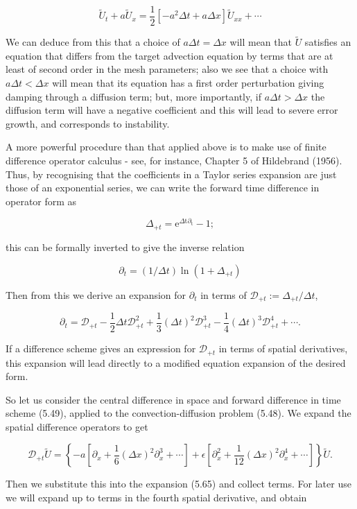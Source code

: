 \documentclass[10pt]{article}
\begin{document}
\[
\tilde{U}_{t}+a \tilde{U}_{x}=\frac{1}{2}\left[-a^{2} \Delta t+a \Delta x\right] \tilde{U}_{x x}+\cdots
\]

We can deduce from this that a choice of \(a \Delta t=\Delta x\) will mean that \(\tilde{U}\) satisfies an equation that differs from the target advection equation by terms that are at least of second order in the mesh parameters; also we see that a choice with \(a \Delta t<\Delta x\) will mean that its equation has a first order perturbation giving damping through a diffusion term; but, more importantly, if \(a \Delta t>\Delta x\) the diffusion term will have a negative coefficient and this will lead to severe error growth, and corresponds to instability.

A more powerful procedure than that applied above is to make use of finite difference operator calculus - see, for instance, Chapter 5 of Hildebrand (1956). Thus, by recognising that the coefficients in a Taylor series expansion are just those of an exponential series, we can write the forward time difference in operator form as

\[
\Delta_{+t}=\mathrm{e}^{\Delta \mathrm{t} \partial_{\mathrm{t}}}-1 ;
\]

this can be formally inverted to give the inverse relation

\[
\partial_{t}=(1 / \Delta t) \ln \left(1+\Delta_{+t}\right)
\]

Then from this we derive an expansion for \(\partial_{t}\) in terms of \(\mathcal{D}_{+t}:=\Delta_{+t} / \Delta t\),

\[
\partial_{t}=\mathcal{D}_{+t}-\frac{1}{2} \Delta t \mathcal{D}_{+t}^{2}+\frac{1}{3}(\Delta t)^{2} \mathcal{D}_{+t}^{3}-\frac{1}{4}(\Delta t)^{3} \mathcal{D}_{+t}^{4}+\cdots .
\]

If a difference scheme gives an expression for \(\mathcal{D}_{+t}\) in terms of spatial derivatives, this expansion will lead directly to a modified equation expansion of the desired form.

So let us consider the central difference in space and forward difference in time scheme (5.49), applied to the convection-diffusion problem (5.48). We expand the spatial difference operators to get

\[
\mathcal{D}_{+t} \tilde{U}=\left\{-a\left[\partial_{x}+\frac{1}{6}(\Delta x)^{2} \partial_{x}^{3}+\cdots\right]+\epsilon\left[\partial_{x}^{2}+\frac{1}{12}(\Delta x)^{2} \partial_{x}^{4}+\cdots\right]\right\} \tilde{U} .
\]

Then we substitute this into the expansion (5.65) and collect terms. For later use we will expand up to terms in the fourth spatial derivative, and obtain
\end{document}
